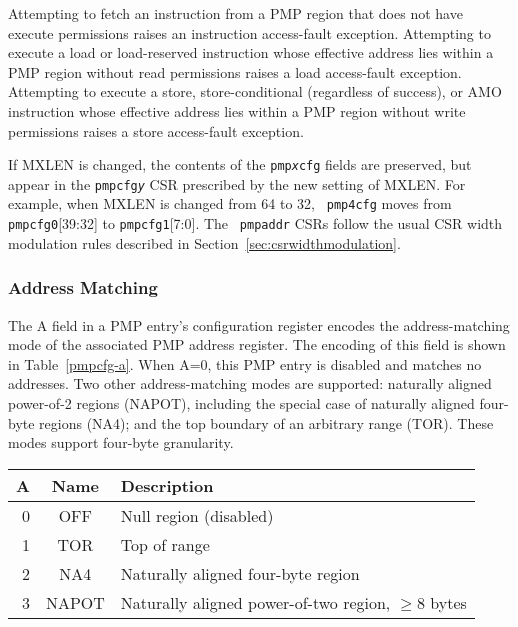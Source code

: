 Attempting to fetch an instruction from a PMP region that does not have execute
permissions raises an instruction access-fault exception.  Attempting to execute
a load or load-reserved instruction whose effective address lies within
a PMP region without read permissions raises a load access-fault exception.
Attempting to execute a store, store-conditional (regardless of success),
or AMO instruction whose effective address lies within a PMP region without
write permissions raises a store access-fault exception.

If MXLEN is changed, the contents of the {\tt pmp{\em x}cfg} fields are
preserved, but appear in the {\tt pmpcfg{\em y}} CSR prescribed by the new
setting of MXLEN.  For example, when MXLEN is changed from 64 to 32, {\tt
pmp4cfg} moves from {\tt pmpcfg0}[39:32] to {\tt pmpcfg1}[7:0].  The {\tt
pmpaddr} CSRs follow the usual CSR width modulation rules described in
Section~\ref{sec:csrwidthmodulation}.

\subsubsection*{Address Matching}

The A field in a PMP entry's configuration register encodes the
address-matching mode of the associated PMP address register.  The encoding of
this field is shown in Table~\ref{pmpcfg-a}.  When A=0, this PMP entry is
disabled and matches no addresses.  Two other address-matching modes are
supported: naturally aligned power-of-2 regions (NAPOT), including the special
case of naturally aligned four-byte regions (NA4); and the top boundary of an
arbitrary range (TOR).  These modes support four-byte granularity.

\begin{table*}[h!]
\begin{center}
\begin{tabular}{|r|c|l|}
\hline
A & Name & Description \\
\hline
0 & OFF   & Null region (disabled) \\
1 & TOR   & Top of range \\
2 & NA4   & Naturally aligned four-byte region \\
3 & NAPOT & Naturally aligned power-of-two region, $\ge$8 bytes \\
\hline
\end{tabular}
\end{center}
\caption{Encoding of A field in PMP configuration registers.}
\label{pmpcfg-a}
\end{table*}

